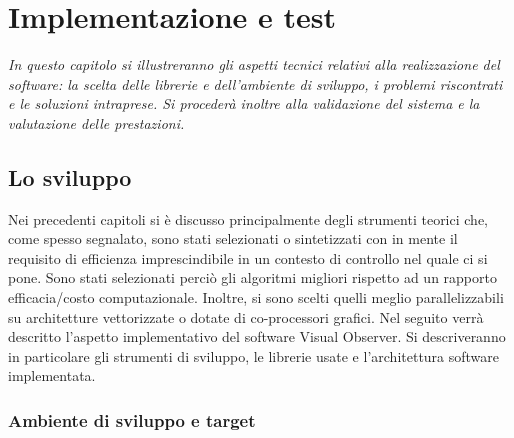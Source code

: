\chapter{Implementazione e test}
\label{chap:implTest}

\begin{minipage}{12cm}\textit{In questo capitolo si illustreranno gli aspetti tecnici relativi alla realizzazione del software: la scelta delle librerie e dell'ambiente di sviluppo, i problemi riscontrati e le soluzioni intraprese. Si procederà inoltre alla validazione del sistema e la valutazione delle prestazioni.}
\end{minipage}

\vspace*{1cm}

\section{Lo sviluppo}
\label{sec:sviluppo}
Nei precedenti capitoli si è discusso principalmente degli strumenti teorici che, come spesso segnalato, sono stati selezionati o sintetizzati con in mente il requisito di efficienza imprescindibile in un contesto di controllo nel quale ci si pone. Sono stati selezionati perciò gli algoritmi migliori rispetto ad un rapporto efficacia/costo computazionale. Inoltre, si sono scelti quelli meglio parallelizzabili su architetture vettorizzate o dotate di co-processori grafici. Nel seguito verrà descritto l'aspetto implementativo del software Visual Observer. Si descriveranno in particolare gli strumenti di sviluppo, le librerie usate e l'architettura software implementata. 

\subsection{Ambiente di sviluppo e target}
\label{sec:dev:ambiente}

